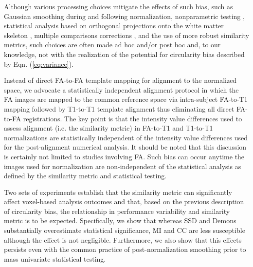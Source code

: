 \documentclass[final,5p,times,twocolumn]{elsarticle}
\begin{document}
Although various processing choices mitigate the effects of such bias,
such as Gaussian smoothing during and following normalization, 
nonparametric testing \citep{Rorden2007}, 
statistical analysis based on orthogonal projections onto the white matter skeleton 
\cite{Smith2006}, multiple comparisons corrections \cite{Nichols2003}, and the use of more robust similarity metrics, 
such choices are often made ad hoc and/or post hoc and, to our 
knowledge, not with the realization of the potential
for circularity bias described by Eqn. (\ref{eq:variance}).  

Instead of direct FA-to-FA template mapping for 
alignment to the normalized space, we advocate a statistically 
independent alignment protocol in which the FA images are mapped to 
the common reference space via intra-subject FA-to-T1 mapping 
followed by T1-to-T1 template alignment thus eliminating all direct
FA-to-FA registrations. The key point is that the intensity value differences used 
to assess alignment (i.e. the similarity metric) in FA-to-T1 and T1-to-T1 
normalizations are statistically independent of the intensity value differences used for 
the post-alignment numerical analysis.  It should be noted that this discussion
is certainly not limited to studies involving FA.  
Such bias can occur anytime the images used for normalization
are non-independent of the statistical analysis as defined by the similarity
metric and statistical testing. 

Two sets of experiments establish that the similarity metric
can significantly affect voxel-based analysis outcomes and that,
based on the previous description of circularity bias,
the relationship in performance variability and similarity metric
is to be expected.  Specifically, we show that whereas SSD and Demons
substantially overestimate statistical significance, MI and CC are less susceptible although the
effect is not
negligible.  Furthermore, we also show that this effects persists
even with the common practice of post-normalization smoothing prior
to mass univariate statistical testing.
\end{document}
